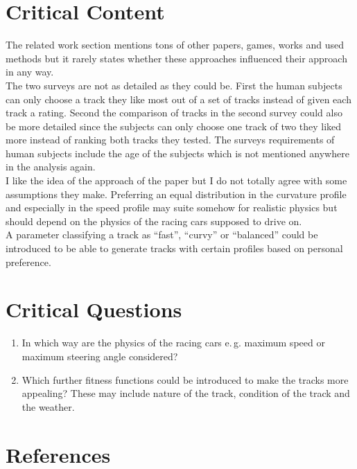 \documentclass[oneside, notitlepage, twocolumn]{scrartcl}
\newcommand{\eg}{e.\,g. }
\begin{document}
\section{Critical Content}
The related work section mentions tons of other papers, games, works and used methods but it rarely states whether these approaches influenced their approach in any way.\\
The two surveys are not as detailed as they could be.
First the human subjects can only choose a track they like most out of a set of tracks instead of given each track a rating.
Second the comparison of tracks in the second survey could also be more detailed since the subjects can only choose one track of two they liked more instead of ranking both tracks they tested.
The surveys requirements of human subjects include the age of the subjects which is not mentioned anywhere in the analysis again.\\
I like the idea of the approach of the paper but I do not totally agree with some assumptions they make.
Preferring an equal distribution in the curvature profile and especially in the speed profile may suite somehow for realistic physics but should depend on the physics of the racing cars supposed to drive on.\\
A parameter classifying a track as ``fast'', ``curvy'' or ``balanced'' could be introduced to be able to generate tracks with certain profiles based on personal preference.

\section{Critical Questions}
\begin{enumerate}
    \item In which way are the physics of the racing cars \eg maximum speed or maximum steering angle considered?
    \item Which further fitness functions could be introduced to make the tracks more appealing? These may include nature of the track, condition of the track and the weather.
\end{enumerate}

\section{References}
\begingroup
\renewcommand{\section}[2]{}%
\nocite{*}
\printbibliography%
\endgroup
\end{document}
